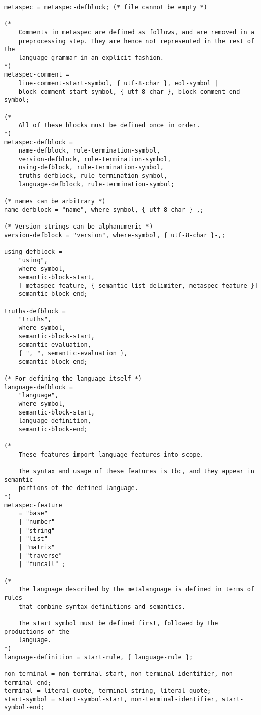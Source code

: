 \begin{lstlisting}
metaspec = metaspec-defblock; (* file cannot be empty *)

(* 
    Comments in metaspec are defined as follows, and are removed in a 
    preprocessing step. They are hence not represented in the rest of the 
    language grammar in an explicit fashion. 
*)
metaspec-comment =
    line-comment-start-symbol, { utf-8-char }, eol-symbol |
    block-comment-start-symbol, { utf-8-char }, block-comment-end-symbol;

(* 
    All of these blocks must be defined once in order.
*)
metaspec-defblock = 
    name-defblock, rule-termination-symbol, 
    version-defblock, rule-termination-symbol, 
    using-defblock, rule-termination-symbol, 
    truths-defblock, rule-termination-symbol, 
    language-defblock, rule-termination-symbol;

(* names can be arbitrary *)
name-defblock = "name", where-symbol, { utf-8-char }-,;

(* Version strings can be alphanumeric *)
version-defblock = "version", where-symbol, { utf-8-char }-,;

using-defblock =
    "using",
    where-symbol,
    semantic-block-start,
    [ metaspec-feature, { semantic-list-delimiter, metaspec-feature }]
    semantic-block-end;

truths-defblock =
    "truths",
    where-symbol, 
    semantic-block-start,
    semantic-evaluation,
    { ", ", semantic-evaluation },
    semantic-block-end;

(* For defining the language itself *)
language-defblock =
    "language",
    where-symbol,
    semantic-block-start,
    language-definition,
    semantic-block-end;

(* 
    These features import language features into scope.

    The syntax and usage of these features is tbc, and they appear in semantic
    portions of the defined language.
*)
metaspec-feature
    = "base"
    | "number"
    | "string"
    | "list"
    | "matrix"
    | "traverse"
    | "funcall" ;

(*
    The language described by the metalanguage is defined in terms of rules 
    that combine syntax definitions and semantics.

    The start symbol must be defined first, followed by the productions of the
    language.
*)
language-definition = start-rule, { language-rule };

non-terminal = non-terminal-start, non-terminal-identifier, non-terminal-end;
terminal = literal-quote, terminal-string, literal-quote;
start-symbol = start-symbol-start, non-terminal-identifier, start-symbol-end;


\end{lstlisting}
